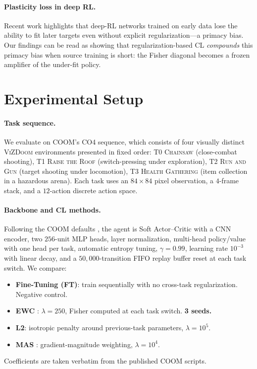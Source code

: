 \documentclass[11pt,a4paper]{article}
\begin{document}
\paragraph{Plasticity loss in deep RL.} Recent work
\cite{lyle2022plasticity,nikishin2022primacy} highlights that deep-RL
networks trained on early data lose the ability to fit later targets even
without explicit regularization---a primacy bias. Our findings can be read
as showing that regularization-based CL \emph{compounds} this primacy bias
when source training is short: the Fisher diagonal becomes a frozen
amplifier of the under-fit policy.

\section{Experimental Setup}
\label{sec:setup}

\paragraph{Task sequence.} We evaluate on COOM's CO4 sequence, which
consists of four visually distinct \textsc{ViZDoom} environments presented
in fixed order: T0 \textsc{Chainsaw} (close-combat shooting), T1
\textsc{Raise the Roof} (switch-pressing under exploration), T2 \textsc{Run
and Gun} (target shooting under locomotion), T3 \textsc{Health Gathering}
(item collection in a hazardous arena). Each task uses an $84{\times}84$
pixel observation, a $4$-frame stack, and a $12$-action discrete action
space.

\paragraph{Backbone and CL methods.} Following the COOM defaults
\cite{tomilin2024coom}, the agent is Soft Actor--Critic
\cite{haarnoja2018sac} with a CNN encoder, two $256$-unit MLP heads, layer
normalization, multi-head policy/value with one head per task, automatic
entropy tuning, $\gamma = 0.99$, learning rate $10^{-3}$ with linear decay,
and a $50{,}000$-transition FIFO replay buffer reset at each task switch.
We compare:
\begin{itemize}[leftmargin=1.5em,topsep=2pt,itemsep=2pt]
    \item \textbf{Fine-Tuning (FT)}: train sequentially with no
        cross-task regularization. Negative control.
    \item \textbf{EWC} \cite{kirkpatrick2017ewc}: $\lambda = 250$, Fisher
        computed at each task switch. \textbf{3 seeds.}
    \item \textbf{L2}: isotropic penalty around previous-task parameters,
        $\lambda = 10^{5}$.
    \item \textbf{MAS} \cite{aljundi2018mas}: gradient-magnitude weighting,
        $\lambda = 10^{4}$.
\end{itemize}
Coefficients are taken verbatim from the published COOM scripts.
\end{document}
